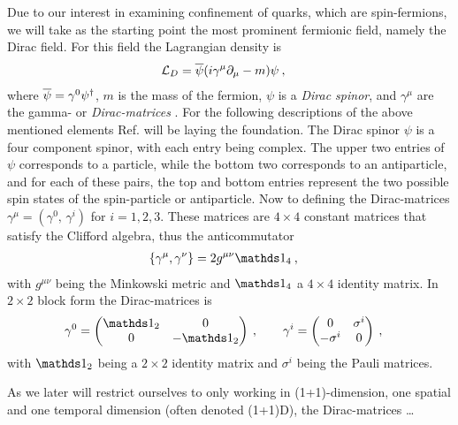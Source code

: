 \documentclass[../main.tex]{subfiles} %
\begin{document}
Due to our interest in examining confinement of quarks, which are spin-\half fermions, we will take as the starting point the most prominent fermionic field, namely the Dirac field. For this field the Lagrangian density is
\begin{align} \label{eq:DiracLagrangiangDensity}
    \mathcal{L}_D &= \overline{\psi} (i \gamma^\mu \partial_\mu - m) \psi \: ,
\end{align}
where $\psibar = \gamma^0 \psi\dagger$, $m$ is the mass of the fermion, $\psi$ is a \emph{Dirac spinor}, and $\gamma^\mu$ are the gamma- or \emph{Dirac-matrices} \cite{peskin_introToQFT_1995,sakurai_modernQM_2017}. For the following descriptions of the above mentioned elements Ref. \cite{peskin_introToQFT_1995} will be laying the foundation. The Dirac spinor $\psi$ is a four component spinor, with each entry being complex. The upper two entries of $\psi$ corresponds to a particle, while the bottom two corresponds to an antiparticle, and for each of these pairs, the top and bottom entries represent the two possible spin states of the spin-\half particle or antiparticle. Now to defining the Dirac-matrices $\gamma^\mu = (\gamma^0,\, \gamma^i)$ for $i=1,2,3$. These matrices are $4 \times 4$ constant matrices that satisfy the Clifford algebra, thus the anticommutator
\begin{align}
    \anticommutator{\gamma^\mu}{\gamma^\nu} &= 2g^{\mu\nu}\id_4 \: ,
\end{align}
with $g^{\mu\nu}$ being the Minkowski metric and $\id_4$ a $4 \times 4$ identity matrix. In $2 \times 2$ block form the Dirac-matrices is
\begin{align}
    \gamma^0 &=
        \begin{pmatrix}
            \id_2 & 0 \\
            0 & -\id_2
        \end{pmatrix} \: , \qquad
    \gamma^i =
        \begin{pmatrix}
            0 & \sigma^i \\
            -\sigma^i & 0
        \end{pmatrix} \: ,
\end{align}
with $\id_2$ being a $2 \times 2$ identity matrix and $\sigma^i$ being the Pauli matrices.

As we later will restrict ourselves to only working in (1+1)-dimension, one spatial and one temporal dimension (often denoted (1+1)D), the Dirac-matrices \ldots
\end{document}
